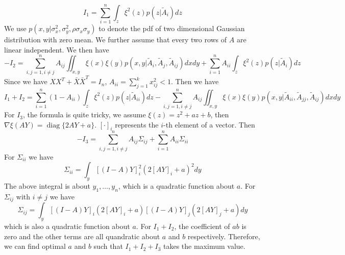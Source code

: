 \documentclass{article}
\DeclareMathOperator*{\diag}{diag}
\begin{document}
\begin{equation*}
I_1 = \sum_{i=1}^n \int_z \xi^2(z) p(z| \widetilde{A}_{i}) dz
\end{equation*}
We use $p(x,y | \sigma^2_x, \sigma^2_y, \rho \sigma_x \sigma_y)$ to denote the pdf of two dimensional Gaussian distribution with zero mean. 
We further assume that every two rows of $A$ are linear independent.
We then have
\begin{equation*}
-I_2   = \sum_{i,j=1, i \neq j}^n A_{ij} \iint_{x,y} \xi(x)\xi(y) p(x,y| \widetilde{A}_{i}, \widetilde{A}_{j}, \widetilde{A}_{ij}) dx dy + \sum_{i=1}^n A_{ii} \int_z \xi^2(z) p(z | \widetilde{A}_i) dz 
\end{equation*}
Since we have $XX^T + \bar{X}\bar{X}^T = I_n$, $A_{ii} = \sum_{j=1}^k x^2_{ij} < 1$. Then we have
\begin{equation*}
I_1+ I_2 =   \sum_{i=1}^n (1-A_{ii}) \int_z \xi^2(z) p(z | \widetilde{A}_{ii}) dz  - \sum_{i,j=1, i \neq j}^n A_{ij} \iint_{x,y} \xi(x)\xi(y) p(x,y| \widetilde{A}_{ii}, \widetilde{A}_{jj}, \widetilde{A}_{ij}) dx dy
\end{equation*}
For $I_3$, the formula is quite tricky, we assume $\xi(z) = z^2 + a z + b $, then $\nabla \xi (AY) = \diag\{2AY+ a\}$. $[\cdot]_i$ represents the $i$-th element of a vector.
Then
\begin{equation*}
-I_3 = \sum_{i,j=1, i \neq j}^n A_{ij}\Sigma_{ij} + \sum_{i=1}^n A_{ii}\Sigma_{ii}
\end{equation*}
For $\Sigma_{ii}$ we have
\begin{equation*}
\Sigma_{ii} = \int_y [(I - A)Y]^2_i (2[AY]_i + a)^2 dy
\end{equation*}
The above integral is about $y_1, \dots, y_n$, which is a quadratic function about $a$.
For $\Sigma_{ij}$ with $i\neq j$ we have
\begin{equation*}
\Sigma_{ij} = \int_y [(I - A)Y]_i (2[AY]_i + a)[(I - A)Y]_j (2[AY]_j + a) dy
\end{equation*}
which is also a quadratic function about $a$.
For $I_1 + I_2$, the coefficient of $ab$ is zero and the other terms are all quandratic about $a$ and $b$ respectively. Therefore, we can find optimal $a$ and $b$ such that $I_1 + I_2 + I_3$ takes the maximum value.
\end{document}
